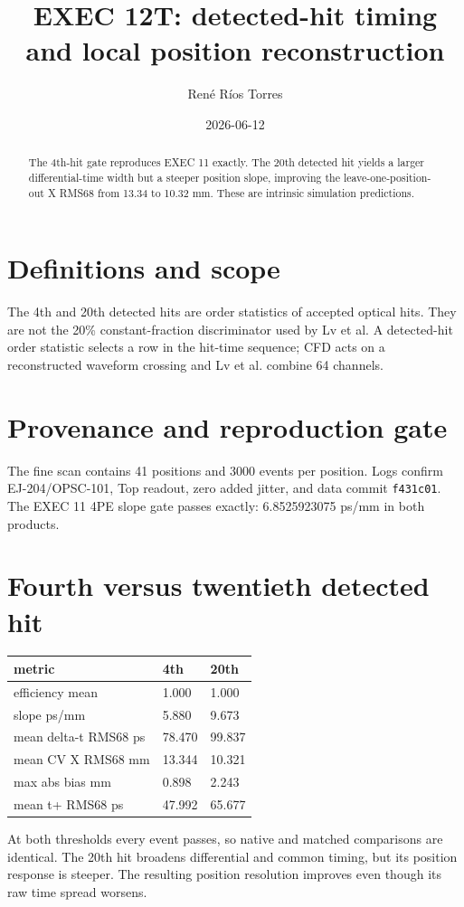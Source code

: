 \documentclass{article}
\title{EXEC 12T: detected-hit timing and local position reconstruction}
\author{René Ríos Torres}
\date{2026-06-12}
\begin{document}
\maketitle
\begin{abstract}
The 4th-hit gate reproduces EXEC 11 exactly. The 20th detected hit yields a
larger differential-time width but a steeper position slope, improving the
leave-one-position-out X RMS68 from 13.34 to
10.32 mm. These are intrinsic simulation predictions.
\end{abstract}
\section{Definitions and scope}
The 4th and 20th detected hits are order statistics of accepted optical hits.
They are not the 20\% constant-fraction discriminator used by Lv et al. A
detected-hit order statistic selects a row in the hit-time sequence; CFD acts
on a reconstructed waveform crossing and Lv et al. combine 64 channels.
\section{Provenance and reproduction gate}
The fine scan contains 41 positions and 3000 events per position. Logs confirm
EJ-204/OPSC-101, Top readout, zero added jitter, and data commit
\texttt{f431c01}. The EXEC 11 4PE slope gate passes exactly:
6.8525923075 ps/mm in both products.
\section{Fourth versus twentieth detected hit}
\begin{center}
\begin{tabular}{lll}
metric & 4th & 20th \\
\hline
efficiency mean & 1.000 & 1.000 \\
slope ps/mm & 5.880 & 9.673 \\
mean delta-t RMS68 ps & 78.470 & 99.837 \\
mean CV X RMS68 mm & 13.344 & 10.321 \\
max abs bias mm & 0.898 & 2.243 \\
mean t+ RMS68 ps & 47.992 & 65.677 \\
\end{tabular}

\end{center}
At both thresholds every event passes, so native and matched comparisons are
identical. The 20th hit broadens differential and common timing, but its
position response is steeper. The resulting position resolution improves even
though its raw time spread worsens.
\end{document}
